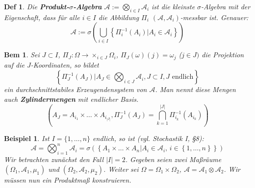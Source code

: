 \documentclass[a4paper,11pt]{book}
\def\AA{ \mathcal{A} }
\newtheorem*{DefON}{Def}[chapter]
\newtheorem{Bsp}{Beispiel}[chapter]
\newtheorem*{BemON}{Bem}[chapter]
\theoremstyle{nonumberplain}
\begin{document}
\begin{DefON} Die \textbf{Produkt-$\sigma$-Algebra} $\AA:=\bigotimes_{i\in I}\AA_i$ ist die kleinste $\sigma$-Algebra mit der Eigenschaft, dass für alle $i\in I$ die Abbildung $\Pi_i$ $(\AA,\AA_i)$-messbar ist. Genauer: \\
\begin{displaymath}
\AA := \sigma \left( \bigcup_{i\in I} \left\{ \Pi^{-1}_i(A_i) | A_i \in \AA_i\right\}\right)
\end{displaymath}
\end{DefON}

\begin{BemON} Sei $J\subset I$, $\Pi_J:\Omega\to\times_{i\in J}\Omega_i$, $\Pi_J(\omega)(j)=\omega_j$ ($j\in J)$ die Projektion auf die $J$-Koordinaten, so bildet \\
\begin{displaymath}
\left\{\Pi_J^{-1}\left(A_J\right) | A_J \in \bigotimes_{i\in J} \AA_i, J\subset I, J\text{ endlich}\right\}
\end{displaymath}
ein durchschnittstabiles Erzeugendensystem von $\AA$. Man nennt diese Mengen auch \textbf{Zylindermengen} mit endlicher Basis.
\begin{displaymath}
\left( A_J=A_{i_1}\times\dots\times A_{i_{|J|}}, \Pi_J^{-1}\left( A_J\right)=\bigcap_{k=1}^{|J|}\Pi_{i_k}^{-1}\left( A_{i_k}\right)\right)
\end{displaymath}
\end{BemON}

\begin{Bsp} Ist $I=\{1,\dots,n\}$ endlich, so ist (vgl. Stochastik I, §8): \\
\begin{displaymath}
\AA=\bigotimes_{i=1}^n\AA_i=\sigma\left(\left\{A_1\times\dots\times A_n | A_i\in\AA_i\text{, }i\in\left\{1,\dots,n\right\}\right\}\right)
\end{displaymath}
Wir betrachten zunächst den Fall $|I|=2$. Gegeben seien zwei Maßräume $(\Omega_1,\AA_1,\mu_1)$ und $(\Omega_2,\AA_2,\mu_2)$. Weiter sei $\Omega=\Omega_1\times\Omega_2$, $\AA=\AA_1\otimes\AA_2$. Wir müssen nun ein Produktmaß konstruieren.
\end{Bsp}
\end{document}
